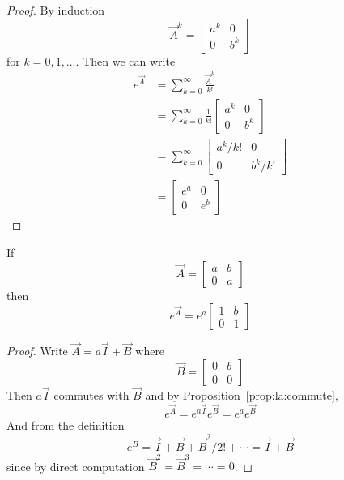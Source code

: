\begin{proof}
	By induction
	\begin{equation*}
		\vec A^k = 
		\begin{bmatrix}
			a^k & 0 \\
			0 & b^k
		\end{bmatrix}
	\end{equation*}
	for $k = 0, 1, \dotsc$. Then we can write
	\begin{align*}
		e^{\vec A} 	&= \sum_{k = 0}^\infty \frac{\vec A^k}{k!} \\
					&= \sum_{k = 0}^\infty \frac{1}{k!}
					\begin{bmatrix}
						a^k & 0 \\
						0 & b^k
					\end{bmatrix} \\
					&= \sum_{k = 0}^\infty
					\begin{bmatrix}
						a^k / k!	& 0 \\
						0 			& b^k / k!
					\end{bmatrix} \\
					&= 
					\begin{bmatrix}
						e^a & 0 \\
						0 & e^b
					\end{bmatrix}
	\end{align*}
\end{proof}

\begin{proposition} %
	\label{prop:la:degenerate}
	If
	\begin{equation*}
		\vec A =
		\begin{bmatrix}
			a & b \\
			0 & a
		\end{bmatrix}
	\end{equation*}
	then
	\begin{equation*}
		e^{\vec A} = e^a
		\begin{bmatrix}
			1 & b \\
			0 & 1
		\end{bmatrix}
	\end{equation*}
\end{proposition}

\begin{proof}
	Write $\vec A = a \vec I + \vec B$ where
	\begin{equation*}
		\vec B =
		\begin{bmatrix}
			0 & b \\
			0 & 0
		\end{bmatrix}
	\end{equation*}
	Then $a\vec I$ commutes with $\vec B$ and by Proposition~\ref{prop:la:commute},
	\begin{equation*}
		e^{\vec A} = e^{a \vec I}e^{\vec B} = e^{a}e^{\vec B}
	\end{equation*}
	And from the definition
	\begin{equation*}
		e^{\vec B} = \vec I + \vec B + \vec B^2 / 2! + \cdots = \vec I + \vec B
	\end{equation*}
	since by direct computation $\vec B^2 = \vec B^3 = \cdots = 0$.
\end{proof}


